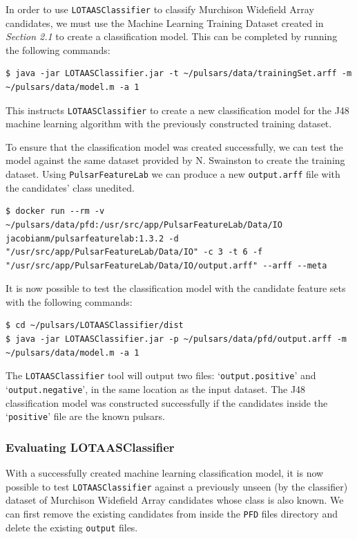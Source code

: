 \documentclass{article}
\begin{document}
In order to use \verb|LOTAASClassifier| to classify Murchison Widefield Array candidates, we must use the Machine Learning Training Dataset created in \emph{Section 2.1} to create a classification model. This can be completed by running the following commands:

\begin{lstlisting}[numbers=none]
$ java -jar LOTAASClassifier.jar -t ~/pulsars/data/trainingSet.arff -m ~/pulsars/data/model.m -a 1
\end{lstlisting}

This instructs \verb|LOTAASClassifier| to create a new classification model for the J48 machine learning algorithm with the previously constructed training dataset.

To ensure that the classification model was created successfully, we can test the model against the same dataset provided by N. Swainston to create the training dataset. Using \verb|PulsarFeatureLab| we can produce a new \verb|output.arff| file with the candidates' class unedited.

\begin{lstlisting}[numbers=none]
$ docker run --rm -v ~/pulsars/data/pfd:/usr/src/app/PulsarFeatureLab/Data/IO jacobianm/pulsarfeaturelab:1.3.2 -d "/usr/src/app/PulsarFeatureLab/Data/IO" -c 3 -t 6 -f "/usr/src/app/PulsarFeatureLab/Data/IO/output.arff" --arff --meta
\end{lstlisting}

It is now possible to test the classification model with the candidate feature sets with the following commands:

\begin{lstlisting}[numbers=none]
$ cd ~/pulsars/LOTAASClassifier/dist
$ java -jar LOTAASClassifier.jar -p ~/pulsars/data/pfd/output.arff -m ~/pulsars/data/model.m -a 1
\end{lstlisting}

The \verb|LOTAASClassifier| tool will output two files: `\verb|output.positive|' and `\verb|output.negative|', in the same location as the input dataset. The J48 classification model was constructed successfully if the candidates inside the `\verb|positive|' file are the known pulsars.

\subsubsection{Evaluating LOTAASClassifier}

With a successfully created machine learning classification model, it is now possible to test \verb|LOTAASClassifier| against a previously unseen (by the classifier) dataset of Murchison Widefield Array candidates whose class is also known. We can first remove the existing candidates from inside the \verb|PFD| files directory and delete the existing \verb|output| files.
\end{document}
